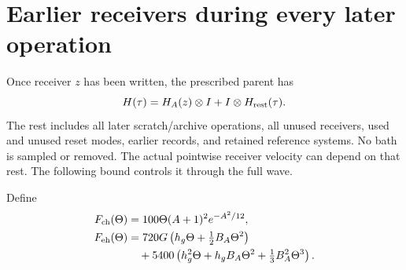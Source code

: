 \documentclass[11pt]{article}
\numberwithin{equation}{section}
\theoremstyle{definition}
\theoremstyle{remark}
\begin{document}
\section{Earlier receivers during every later operation}
\label{p2r:sec:hold}

Once receiver $z$ has been written, the prescribed parent has
\begin{equation}\label{p2r:eq:spectator}
 H(\tau)=H_A(z)\otimes I+I\otimes H_{\rm rest}(\tau).
\end{equation}
The rest includes all later scratch/archive operations, all
unused receivers, used and unused reset modes, earlier records,
and retained reference systems. No bath is sampled or removed.
The actual pointwise receiver velocity can depend on that rest.
The following bound controls it through the full wave.

Define
\begin{align}
 F_{\rm ch}(\Theta)
 &=100\Theta(A+1)^2e^{-A^2/12},\label{p2r:eq:holdcmp}\\
 F_{\rm eh}(\Theta)
 &=720G\left(h_g\Theta+\tfrac12B_A\Theta^2\right)
 \notag\\
 &\quad+5400\left(h_g^2\Theta+h_gB_A\Theta^2+
                              \tfrac13B_A^2\Theta^3\right).
 \label{p2r:eq:holderror}
\end{align}
\end{document}
